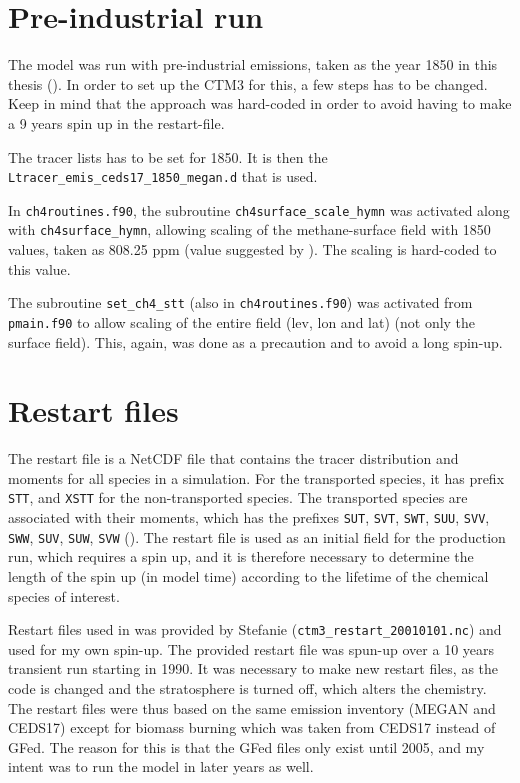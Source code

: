 \section{Pre-industrial run}\label{sec:PI_setup}

The model was run with pre-industrial emissions, taken as the year 1850 in this thesis (\cite{IPCCchapter8}). In order to set up the CTM3 for this, a few steps has to be changed. Keep in mind that the approach was hard-coded in order to avoid having to make a 9 years spin up in the restart-file. 

\medskip

The tracer lists has to be set for 1850. It is then the \texttt{Ltracer\_emis\_ceds17\_1850\_megan.d} that is used. 

\medskip

In \texttt{ch4routines.f90}, the subroutine \texttt{ch4surface\_scale\_hymn} was activated along with \texttt{ch4surface\_hymn}, allowing scaling of the methane-surface field with 1850 values, taken as 808.25 ppm (value suggested by \cite{RagnhildPersonal}). The scaling is hard-coded to this value. 

\medskip

The subroutine \texttt{set\_ch4\_stt} (also in \texttt{ch4routines.f90}) was activated from \texttt{pmain.f90} to allow scaling of the entire field (lev, lon and lat) (not only the surface field). This, again, was done as a precaution and to avoid a long spin-up. 

\section{Restart files}\label{subsec:restart_files}


The restart file is a NetCDF file that contains the tracer distribution and moments for all species in a simulation. For the transported species, it has prefix \texttt{STT}, and \texttt{XSTT} for the non-transported species. The transported species are associated with their moments, which has the prefixes \texttt{SUT}, \texttt{SVT}, \texttt{SWT}, \texttt{SUU}, \texttt{SVV}, \texttt{SWW}, \texttt{SUV}, \texttt{SUW}, \texttt{SVW} (\cite{SovdeManual}). The restart file is used as an initial field for the production run, which requires a spin up, and it is therefore necessary to determine the length of the spin up (in model time) according to the lifetime of the chemical species of interest. 

\medskip

Restart files used in \cite{Falk_2019} was provided by Stefanie (\texttt{ctm3\_restart\_20010101.nc}) and used for my own spin-up. The provided restart file was spun-up over a 10 years transient run starting in 1990. It was necessary to make new restart files, as the code is changed and the stratosphere is turned off, which alters the chemistry. The restart files were thus based on the same emission inventory (MEGAN and CEDS17) except for biomass burning which was taken from CEDS17 instead of GFed. The reason for this is that the GFed files only exist until 2005, and my intent was to run the model in later years as well. 

